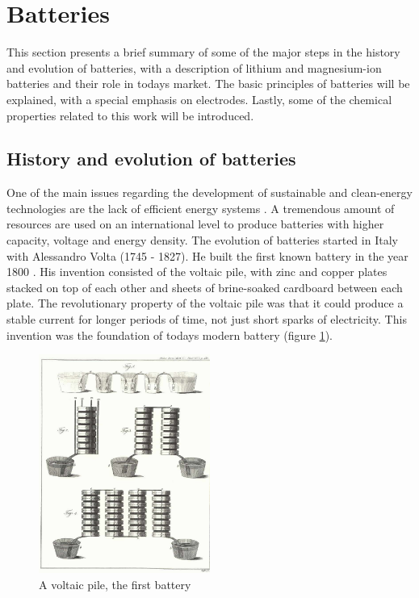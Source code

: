 \section{Batteries}
 	This section presents a brief summary of some of the major steps in the history and evolution of batteries, with a description of lithium and magnesium-ion batteries and their role in todays market. The basic principles of batteries will be explained, with a special emphasis on electrodes. Lastly, some of the chemical properties related to this work will be introduced. 

\subsection{History and evolution of batteries}
One of the main issues regarding the development of sustainable and clean-energy technologies are the lack of efficient energy systems \cite{curtarolo2013high}. A tremendous amount of resources are used on an international level to produce batteries with higher capacity, voltage and energy density. The evolution of batteries started in Italy with Alessandro Volta (1745 - 1827). He built the first known battery in the year 1800 \cite{volta1800electricity}. His invention consisted of the voltaic pile, with zinc and copper plates stacked on top of each other and sheets of  brine-soaked cardboard between each plate. The revolutionary property of the voltaic pile was that it could produce a stable current for longer periods of time, not just short sparks of electricity. This invention was the foundation of todays modern battery (figure \ref{fig:voltaicpile}).

\begin{figure}[ht]
    \centering
    \includegraphics[width=0.5\textwidth]{volta.jpg}
    \caption{A voltaic pile, the first battery \cite{decker2005volta}}
    \label{fig:voltaicpile}
\end{figure}

